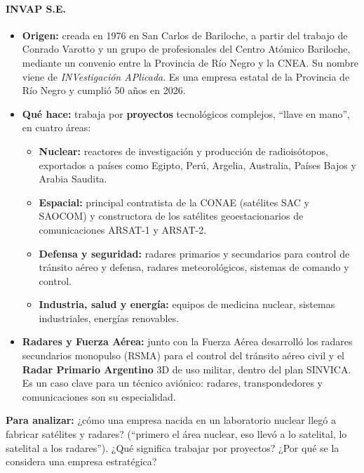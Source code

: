 \paragraph*{INVAP S.E.}
\begin{itemize}
  \item \textbf{Origen:} creada en 1976 en San Carlos de Bariloche, a partir del trabajo de
        Conrado Varotto y un grupo de profesionales del Centro Atómico Bariloche, mediante un
        convenio entre la Provincia de Río Negro y la CNEA. Su nombre viene de
        \textit{INVestigación APlicada}. Es una empresa estatal de la Provincia de Río Negro y
        cumplió 50 años en 2026.
  \item \textbf{Qué hace:} trabaja por \textbf{proyectos} tecnológicos complejos, ``llave en
        mano'', en cuatro áreas:
  \begin{itemize}
    \item \textbf{Nuclear:} reactores de investigación y producción de radioisótopos,
          exportados a países como Egipto, Perú, Argelia, Australia, Países Bajos y Arabia
          Saudita.
    \item \textbf{Espacial:} principal contratista de la CONAE (satélites SAC y SAOCOM) y
          constructora de los satélites geoestacionarios de comunicaciones ARSAT-1 y ARSAT-2.
    \item \textbf{Defensa y seguridad:} radares primarios y secundarios para control de tránsito
          aéreo y defensa, radares meteorológicos, sistemas de comando y control.
    \item \textbf{Industria, salud y energía:} equipos de medicina nuclear, sistemas
          industriales, energías renovables.
  \end{itemize}
  \item \textbf{Radares y Fuerza Aérea:} junto con la Fuerza Aérea desarrolló los radares
        secundarios monopulso (RSMA) para el control del tránsito aéreo civil y el
        \textbf{Radar Primario Argentino} 3D de uso militar, dentro del plan SINVICA. Es un caso
        clave para un técnico aviónico: radares, transpondedores y comunicaciones son su
        especialidad.
\end{itemize}
\textbf{Para analizar:} ¿cómo una empresa nacida en un laboratorio nuclear llegó a fabricar
satélites y radares? (``primero el área nuclear, eso llevó a lo satelital, lo satelital a los
radares''). ¿Qué significa trabajar por proyectos? ¿Por qué se la considera una empresa
estratégica?

